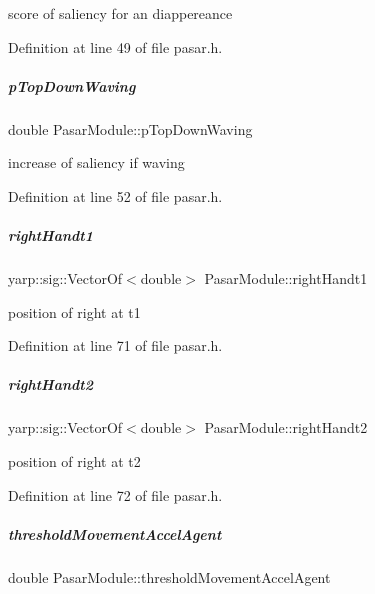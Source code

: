 score of saliency for an diappereance 



Definition at line 49 of file pasar.\+h.

\mbox{\label{group__pasar_a8ac28563deb0e11e7389023ed3e7af83}} 
\subparagraph{\texorpdfstring{p\+Top\+Down\+Waving}{pTopDownWaving}}
{\footnotesize\ttfamily double Pasar\+Module\+::p\+Top\+Down\+Waving\hspace{0.3cm}{\ttfamily [protected]}}



increase of saliency if waving 



Definition at line 52 of file pasar.\+h.

\mbox{\label{group__pasar_aab32988108828bc5647394433f17a896}} 
\subparagraph{\texorpdfstring{right\+Handt1}{rightHandt1}}
{\footnotesize\ttfamily yarp\+::sig\+::\+Vector\+Of$<$double$>$ Pasar\+Module\+::right\+Handt1\hspace{0.3cm}{\ttfamily [protected]}}



position of right at t1 



Definition at line 71 of file pasar.\+h.

\mbox{\label{group__pasar_ae5e94f066c3ecf8eebd2db8ec19f948f}} 
\subparagraph{\texorpdfstring{right\+Handt2}{rightHandt2}}
{\footnotesize\ttfamily yarp\+::sig\+::\+Vector\+Of$<$double$>$ Pasar\+Module\+::right\+Handt2\hspace{0.3cm}{\ttfamily [protected]}}



position of right at t2 



Definition at line 72 of file pasar.\+h.

\mbox{\label{group__pasar_a21daf3a3c5d5b52887083f56a5370262}} 
\subparagraph{\texorpdfstring{threshold\+Movement\+Accel\+Agent}{thresholdMovementAccelAgent}}
{\footnotesize\ttfamily double Pasar\+Module\+::threshold\+Movement\+Accel\+Agent\hspace{0.3cm}{\ttfamily [protected]}}



